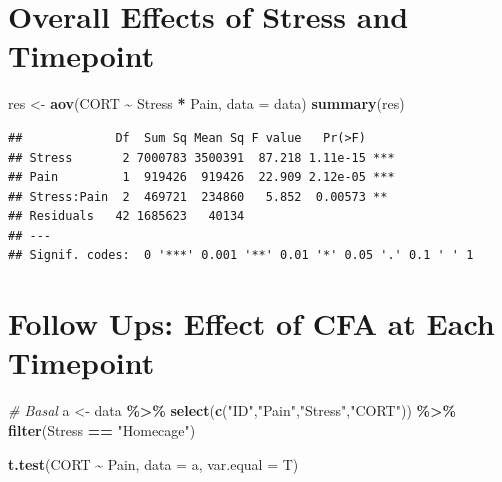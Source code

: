 \documentclass[
]{book}
\newenvironment{Shaded}{\begin{snugshade}}{\end{snugshade}}
\newcommand{\AttributeTok}[1]{\textcolor[rgb]{0.13,0.29,0.53}{#1}}
\newcommand{\CommentTok}[1]{\textcolor[rgb]{0.56,0.35,0.01}{\textit{#1}}}
\newcommand{\FunctionTok}[1]{\textcolor[rgb]{0.13,0.29,0.53}{\textbf{#1}}}
\newcommand{\NormalTok}[1]{#1}
\newcommand{\OtherTok}[1]{\textcolor[rgb]{0.56,0.35,0.01}{#1}}
\newcommand{\SpecialCharTok}[1]{\textcolor[rgb]{0.81,0.36,0.00}{\textbf{#1}}}
\newcommand{\StringTok}[1]{\textcolor[rgb]{0.31,0.60,0.02}{#1}}
\begin{document}
\section*{Overall Effects of Stress and Timepoint}\label{overall-effects-of-stress-and-timepoint}

\begin{Shaded}
\begin{Highlighting}[]
\NormalTok{res }\OtherTok{\textless{}{-}} \FunctionTok{aov}\NormalTok{(CORT }\SpecialCharTok{\textasciitilde{}}\NormalTok{ Stress }\SpecialCharTok{*}\NormalTok{ Pain, }\AttributeTok{data =}\NormalTok{ data)}
\FunctionTok{summary}\NormalTok{(res)}
\end{Highlighting}
\end{Shaded}

\begin{verbatim}
##             Df  Sum Sq Mean Sq F value   Pr(>F)    
## Stress       2 7000783 3500391  87.218 1.11e-15 ***
## Pain         1  919426  919426  22.909 2.12e-05 ***
## Stress:Pain  2  469721  234860   5.852  0.00573 ** 
## Residuals   42 1685623   40134                     
## ---
## Signif. codes:  0 '***' 0.001 '**' 0.01 '*' 0.05 '.' 0.1 ' ' 1
\end{verbatim}

\section*{Follow Ups: Effect of CFA at Each Timepoint}\label{follow-ups-effect-of-cfa-at-each-timepoint}

\begin{Shaded}
\begin{Highlighting}[]
\CommentTok{\# Basal}
\NormalTok{a }\OtherTok{\textless{}{-}}\NormalTok{ data }\SpecialCharTok{\%\textgreater{}\%}
  \FunctionTok{select}\NormalTok{(}\FunctionTok{c}\NormalTok{(}\StringTok{"ID"}\NormalTok{,}\StringTok{"Pain"}\NormalTok{,}\StringTok{"Stress"}\NormalTok{,}\StringTok{"CORT"}\NormalTok{)) }\SpecialCharTok{\%\textgreater{}\%}
  \FunctionTok{filter}\NormalTok{(Stress }\SpecialCharTok{==} \StringTok{"Homecage"}\NormalTok{)}
  
\FunctionTok{t.test}\NormalTok{(CORT }\SpecialCharTok{\textasciitilde{}}\NormalTok{ Pain, }\AttributeTok{data =}\NormalTok{ a, }\AttributeTok{var.equal =}\NormalTok{ T)}
\end{Highlighting}
\end{Shaded}
\end{document}

